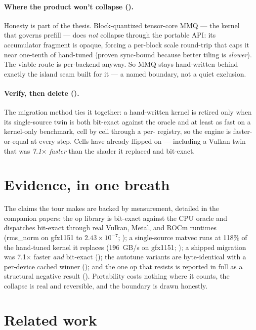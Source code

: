 \documentclass[11pt]{article}
\begin{document}
\paragraph{Where the product won't collapse (\cite{mmq}).} Honesty is part of the thesis. Block-quantized
tensor-core MMQ --- the kernel that governs prefill --- does \emph{not} collapse through the portable API:
its accumulator fragment is opaque, forcing a per-block scale round-trip that caps it near one-tenth of
hand-tuned (proven sync-bound because better tiling is \emph{slower}). The viable route is per-backend
anyway. So MMQ stays hand-written behind exactly the island seam built for it --- a named boundary, not a
quiet exclusion.

\paragraph{Verify, then delete (\cite{method}).} The migration method ties it together: a hand-written
kernel is retired only when its single-source twin is both bit-exact against the oracle and at least as
fast on a kernel-only benchmark, cell by cell through a per- registry, so the
engine is faster-or-equal at every step. Cells have already flipped on  --- including a Vulkan
 twin that was \emph{7.1$\times$ faster} than the shader it replaced and bit-exact.

\section{Evidence, in one breath}
\label{sec:evidence}

The claims the tour makes are backed by measurement, detailed in the companion papers: the op library is
bit-exact against the CPU oracle and dispatches bit-exact through real Vulkan, Metal, and ROCm runtimes
(rms\_norm on gfx1151 to $2.43\times10^{-7}$; \cite{oracle}); a single-source \dpa{} matvec runs at 118\%
of the hand-tuned kernel it replaces (196~GB/s on gfx1151; \cite{method}); a shipped migration was
7.1$\times$ faster \emph{and} bit-exact (\cite{method}); the autotune variants are byte-identical with a
per-device cached winner (\cite{tune}); and the one op that resists is reported in full as a structural
negative result (\cite{mmq}). Portability costs nothing where it counts, the collapse is real and
reversible, and the boundary is drawn honestly.

\section{Related work}
\label{sec:related}
\end{document}
